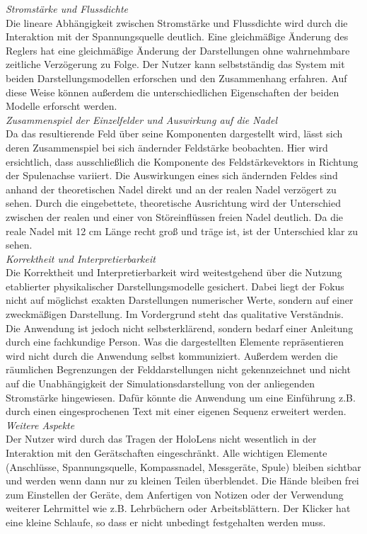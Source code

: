 \textit{Stromstärke und Flussdichte}\\
Die lineare Abhängigkeit zwischen Stromstärke und Flussdichte wird durch die Interaktion mit der Spannungsquelle deutlich. Eine gleichmäßige Änderung des Reglers hat eine gleichmäßige Änderung der Darstellungen ohne wahrnehmbare zeitliche Verzögerung zu Folge. Der Nutzer kann selbstständig das System mit beiden Darstellungsmodellen erforschen und den Zusammenhang erfahren. Auf diese Weise können außerdem die unterschiedlichen Eigenschaften der beiden Modelle erforscht werden.\\

\textit{Zusammenspiel der Einzelfelder und Auswirkung auf die Nadel}\\
Da das resultierende Feld über seine Komponenten dargestellt wird, lässt sich deren Zusammenspiel bei sich ändernder Feldstärke beobachten. Hier wird ersichtlich, dass ausschließlich die Komponente des Feldstärkevektors in Richtung der Spulenachse variiert. Die Auswirkungen eines sich ändernden Feldes sind anhand der theoretischen Nadel direkt und an der realen Nadel verzögert zu sehen. Durch die eingebettete, theoretische Ausrichtung wird der Unterschied zwischen der realen und einer von Störeinflüssen freien Nadel deutlich. Da die reale Nadel mit 12 cm Länge recht groß und träge ist, ist der Unterschied klar zu sehen.\\

\textit{Korrektheit und Interpretierbarkeit}\\
Die Korrektheit und Interpretierbarkeit wird weitestgehend über die Nutzung etablierter physikalischer Darstellungsmodelle gesichert. Dabei liegt der Fokus nicht auf möglichst exakten Darstellungen numerischer Werte, sondern auf einer zweckmäßigen Darstellung. Im Vordergrund steht das qualitative Verständnis.\\

Die Anwendung ist jedoch nicht selbsterklärend, sondern bedarf einer Anleitung durch eine fachkundige Person. Was die dargestellten Elemente repräsentieren wird nicht durch die Anwendung selbst kommuniziert. Außerdem werden die räumlichen Begrenzungen der Felddarstellungen nicht gekennzeichnet und nicht auf die Unabhängigkeit der Simulationsdarstellung von der anliegenden Stromstärke hingewiesen. Dafür könnte die Anwendung um eine Einführung z.B. durch einen eingesprochenen Text mit einer eigenen Sequenz erweitert werden.\\

\textit{Weitere Aspekte}\\
Der Nutzer wird durch das Tragen der HoloLens nicht wesentlich in der Interaktion mit den Gerätschaften eingeschränkt. Alle wichtigen Elemente (Anschlüsse, Spannungsquelle, Kompassnadel, Messgeräte, Spule) bleiben sichtbar und werden wenn dann nur zu kleinen Teilen überblendet. Die Hände bleiben frei zum Einstellen der Geräte, dem Anfertigen von Notizen oder der Verwendung weiterer Lehrmittel wie z.B. Lehrbüchern oder Arbeitsblättern. Der Klicker hat eine kleine Schlaufe, so dass er nicht unbedingt festgehalten werden muss.\\

